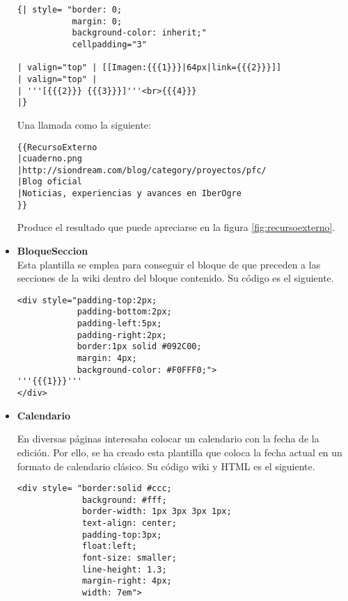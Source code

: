 \begin{itemize}
    \begin{lstlisting}[style=wiki]
{| style= "border: 0;
           margin: 0;
           background-color: inherit;"
           cellpadding="3"
           
| valign="top" | [[Imagen:{{{1}}}|64px|link={{{2}}}]]
| valign="top" | 
| '''[{{{2}}} {{{3}}}]'''<br>{{{4}}}
|}
    \end{lstlisting}
    
    Una llamada como la siguiente:
    
\begin{lstlisting}[style=wiki]
{{RecursoExterno
|cuaderno.png
|http://siondream.com/blog/category/proyectos/pfc/
|Blog oficial
|Noticias, experiencias y avances en IberOgre
}}
    \end{lstlisting}
    
    Produce el resultado que puede apreciarse en la figura \ref{fig:recursoexterno}.\\
    
    
    \item \textbf{BloqueSeccion}\\
    
    Esta plantilla se emplea para conseguir el bloque de que preceden
    a las secciones de la wiki dentro del bloque contenido. Su código
    es el siguiente.
    
    \begin{lstlisting}[style=wiki]
<div style="padding-top:2px;
            padding-bottom:2px;
            padding-left:5px;
            padding-right:2px;
            border:1px solid #092C00;
            margin: 4px;
            background-color: #F0FFF0;">
'''{{{1}}}'''
</div>
    \end{lstlisting}
    
    \item \textbf{Calendario}
    
    En diversas páginas interesaba colocar un calendario con la fecha
    de la edición. Por ello, se ha creado esta plantilla que coloca la fecha
    actual en un formato de calendario clásico. Su código wiki 
    y HTML es el siguiente.
    
    \begin{lstlisting}[style=wiki]
<div style= "border:solid #ccc;
             background: #fff;
             border-width: 1px 3px 3px 1px;
             text-align: center;
             padding-top:3px;
             float:left;
             font-size: smaller;
             line-height: 1.3;
             margin-right: 4px;
             width: 7em">
             

\end{lstlisting}
\end{itemize}
